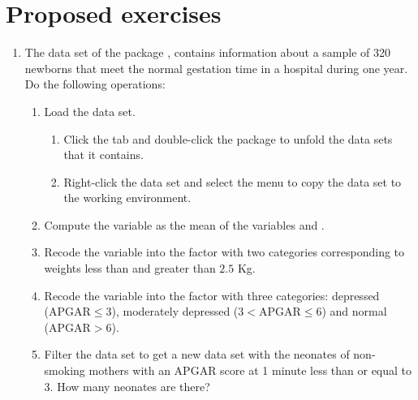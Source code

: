 \section{Proposed exercises}
\begin{enumerate}[leftmargin=*]
\item The data set  of the package , contains information about a
sample of 320 newborns that meet the normal gestation time in a hospital during one year.
Do the following operations:
\begin{enumerate}
\item Load the data set.
\begin{indication}
\begin{enumerate}
\item Click the  tab and double-click the  package to unfold the data sets that
it contains. 
\item Right-click the data set  and select the menu  to copy the data
set to the working environment.
\end{enumerate}
\end{indication}

\item Compute the variable  as the mean of the variables  and
.
\item Recode the variable  into the factor  with two categories
corresponding to weights less than and greater than $2.5$ Kg.
\item Recode the variable  into the factor  with three categories: depressed
(APGAR$\leq 3$), moderately depressed ($3<$APGAR$\leq 6$) and normal (APGAR$>6$).
\item Filter the data set to get a new data set with the neonates of non-smoking mothers with an APGAR score at 1
minute less than or equal to 3.
How many neonates are there?
\end{enumerate}
\end{enumerate}
